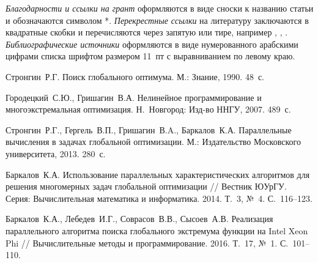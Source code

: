 \documentclass[11pt, oneside, a4paper]{article}
\begin{document}
\emph{Благодарности и ссылки на грант} оформляются в виде сноски к названию статьи и обозначаются символом *. \emph{Перекрестные ссылки} на литературу заключаются в квадратные скобки и перечисляются через запятую или тире, например \cite{eremin}, \cite{eremin,sokolinsky}, \cite{eremin,sokolinsky,stonebraker}. \emph{Библиографические источники} оформляются в виде нумерованного арабскими цифрами списка шрифтом размером 11~пт с выравниванием по левому краю.

\begin{biblio}

Стронгин~Р.Г. Поиск глобального оптимума. М.: Знание, 1990. 48~с.

Городецкий~С.Ю., Гришагин~В.А. Нелинейное программирование и многоэкстремальная оптимизация. Н.~Новгород: Изд-во ННГУ, 2007. 489~с.

Стронгин~Р.Г., Гергель~В.П., Гришагин~В.A., Баркалов~К.А. Параллельные вычисления в задачах глобальной оптимизации. М.: Издательство Московского университета, 2013. 280~с.

Баркалов~К.А. Использование параллельных характеристических алгоритмов для решения многомерных задач глобальной оптимизации  // Вестник ЮУрГУ. Серия: Вычислительная математика и информатика. 2014. Т.~3, №~4. С.~116--123.

Баркалов~К.А., Лебедев~И.Г., Соврасов~В.В., Сысоев~А.В. Реализация параллельного алгоритма поиска глобального экстремума функции на Intel Xeon Phi // Вычислительные методы и программирование. 2016. Т.~17, №~1. С.~101--110.



\end{biblio}
\end{document}
